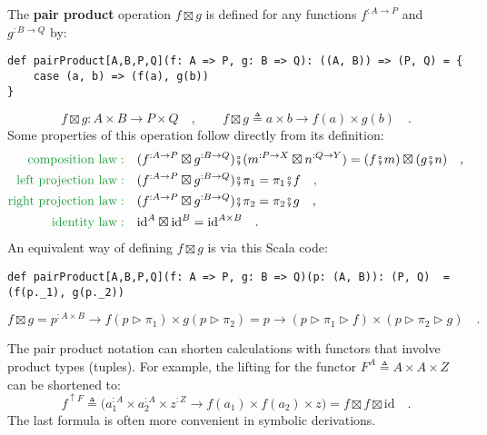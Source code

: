 The \textbf{pair product}
operation $f\boxtimes g$ is defined for any functions $f^{:A\rightarrow P}$
and $g^{:B\rightarrow Q}$ by:
\begin{lstlisting}
def pairProduct[A,B,P,Q](f: A => P, g: B => Q): ((A, B)) => (P, Q) = {
    case (a, b) => (f(a), g(b))
}
\end{lstlisting}
\[
f\boxtimes g:A\times B\rightarrow P\times Q\quad,\quad\quad f\boxtimes g\triangleq a\times b\rightarrow f(a)\times g(b)\quad.
\]
Some  properties of this operation follow directly from its definition:
\begin{align}
{\color{greenunder}\text{composition law}:}\quad & (f^{:A\rightarrow P}\boxtimes g^{:B\rightarrow Q})\bef(m^{:P\rightarrow X}\boxtimes n^{:Q\rightarrow Y})=(f\bef m)\boxtimes(g\bef n)\quad,\label{eq:pair-product-composition-law}\\
{\color{greenunder}\text{left projection law}:}\quad & (f^{:A\rightarrow P}\boxtimes g^{:B\rightarrow Q})\bef\pi_{1}=\pi_{1}\bef f\quad,\label{eq:pair-product-left-projection-law}\\
{\color{greenunder}\text{right projection law}:}\quad & (f^{:A\rightarrow P}\boxtimes g^{:B\rightarrow Q})\bef\pi_{2}=\pi_{2}\bef g\quad,\label{eq:pair-product-right-projection-law}\\
{\color{greenunder}\text{identity law}:}\quad & \text{id}^{A}\boxtimes\text{id}^{B}=\text{id}^{A\times B}\quad.\nonumber 
\end{align}
An equivalent way of defining $f\boxtimes g$ is via this Scala code:
\begin{lstlisting}
def pairProduct[A,B,P,Q](f: A => P, g: B => Q)(p: (A, B)): (P, Q)  =  (f(p._1), g(p._2))
\end{lstlisting}
\[
f\boxtimes g=p^{:A\times B}\rightarrow f(p\triangleright\pi_{1})\times g(p\triangleright\pi_{2})=p\rightarrow(p\triangleright\pi_{1}\triangleright f)\times(p\triangleright\pi_{2}\triangleright g)\quad.
\]

The pair product notation can shorten calculations with functors that
involve product types (tuples). For example, the lifting for the functor
$F^{A}\triangleq A\times A\times Z$ can be shortened to:
\[
f^{\uparrow F}\triangleq\big(a_{1}^{:A}\times a_{2}^{:A}\times z^{:Z}\rightarrow f(a_{1})\times f(a_{2})\times z\big)=f\boxtimes f\boxtimes\text{id}\quad.
\]
The last formula is often more convenient in symbolic derivations. 

